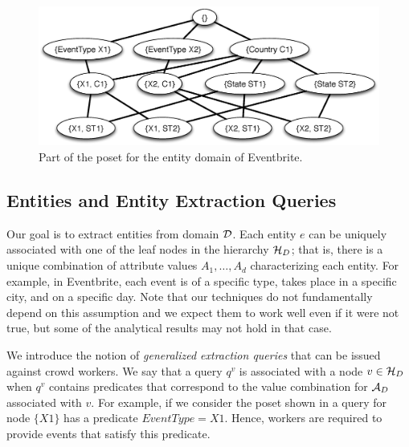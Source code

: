 \begin{figure}
	\begin{center}
	\includegraphics[clip,scale=0.32]{figs/eventsExLattice.eps}
	\caption{Part of the poset for the entity domain of Eventbrite.}
	\label{fig:eventslattice}
	\vspace{-20pt}
	\end{center}
\end{figure}

\subsection{Entities and Entity Extraction Queries}
\label{sec:queries}

 Our goal is to extract entities from domain $\mathcal{D}$. Each entity $e$ can be uniquely associated with one of the leaf nodes in the hierarchy $\mathcal{H}_D$; that is, there is a unique combination of attribute values $A_1, \ldots, A_d$ characterizing each entity. For example, in Eventbrite, each event is of a specific type, takes place in a specific city, and on a specific day. Note that our techniques do not fundamentally depend on this assumption and we expect them to work well even if it were not true, but some of the analytical results may not hold in that case.

 We introduce the notion of {\em generalized extraction queries} that can be issued against crowd workers. We say that a query $q^v$ is associated with a node $v \in \mathcal{H}_D$ when $q^v$ contains predicates that correspond to the value combination for $\mathcal{A}_D$ associated with $v$. For example, if we consider the poset shown in  a query for node $\{X1\}$ has a predicate $EventType = X1$. Hence, workers are required to provide events that satisfy this predicate.

